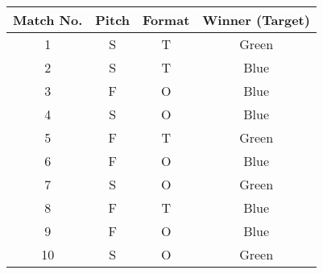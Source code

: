 \begin{table}[h]
\centering
\begin{tabular}{|c|c|c|c|}
\hline
Match No. & Pitch & Format & Winner (Target) \\
\hline
1 & S & T & Green \\
2 & S & T & Blue \\
3 & F & O & Blue \\
4 & S & O & Blue \\
5 & F & T & Green \\
6 & F & O & Blue \\
7 & S & O & Green \\
8 & F & T & Blue \\
9 & F & O & Blue \\
10 & S & O & Green \\
\hline
\end{tabular}
\end{table}
\qfooter

